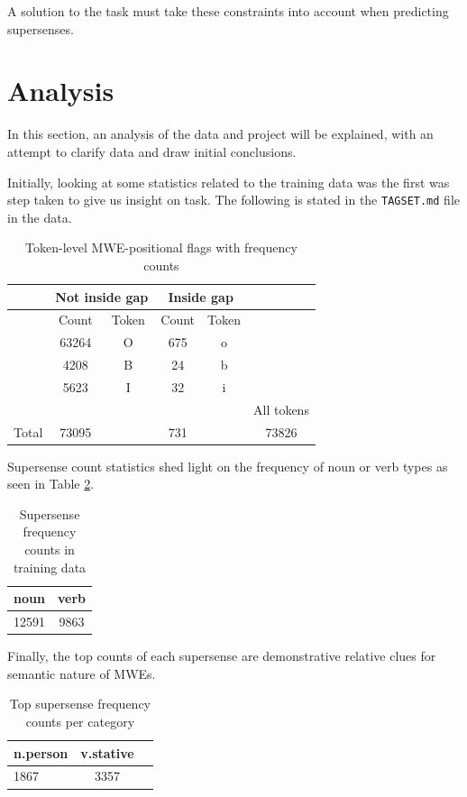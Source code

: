 A solution to the \dimsum task must take these constraints into account when predicting supersenses.

\section{Analysis}
In this section, an analysis of the data and project will be explained, with an attempt to clarify data and draw initial conclusions. 

Initially, looking at some statistics related to the training data was the first was step taken to give us insight on task. The following is stated in the \texttt{TAGSET.md} file in the \dimsum data. 

\begin{table}[H]
\centering
\begin{tabular}{|cccccc|}
\hline
      & \multicolumn{2}{c}{Not inside gap} & \multicolumn{2}{c}{Inside gap} & \\
\hline
      & Count & Token & Count & Token & \\
\hline
\hline
      & 63264 & O & 675 & o & \\
      &  4208 & B & 24  & b & \\ 
      &  5623 & I & 32  & i & \\
\hline
\hline
      &       &   &     &   & All tokens\\
\hline
Total & 73095 &   & 731 &   & 73826\\
\hline
\end{tabular}
\caption{Token-level MWE-positional flags with frequency counts}
\label{tab:mwetokencounts}
\end{table}

Supersense count statistics shed light on the frequency of noun or verb types as seen in Table \ref{tab:ssnvcounts}.

\begin{table}[H]
\centering
\begin{tabular}{cc}
noun  & verb\\
\hline
12591 & 9863\\
\end{tabular}
\caption{Supersense frequency counts in \dimsum training data}
\label{tab:ssnvcounts}
\end{table}

Finally, the top counts of each supersense are demonstrative relative clues for semantic nature of MWEs.

\begin{table}[H]
\centering
\begin{tabular}{lcc}
n.person & v.stative\\
\hline
1867     & 3357\\
\end{tabular}
\label{tab:topssnvcounts}
\caption{Top supersense frequency counts per category}
\end{table}

